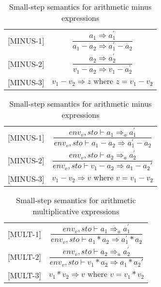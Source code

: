 \begin{table}[H]
    \centering
    \begin{longtable}[c] { r c }
        
        [MINUS-1] & \( \dfrac{a_1 \Rightarrow a^{'}_{1}}{a_1 - a_2 \Rightarrow a^{'}_{1} - a_2} \) \\
        
        [MINUS-2] & \( \dfrac{a_2 \Rightarrow a^{'}_{2}}{v_1 - a_2 \Rightarrow v_1 - a^{'}_{2}} \) \\
        
        [MINUS-3] & \(v_1 - v_2 \Rightarrow z \text{ where } z = v_1 - v_2\) \\
        
        
    \end{longtable}
    \caption{Small-step semantics for arithmetic minus expressions}
\end{table}


\begin{table}[H]
    \centering
    \begin{longtable}[c] { r c }
        [MINUS-1] & \( \dfrac{ env_v,sto \vdash a_1 \Rightarrow_a a^{'}_{1}}{env_v,sto \vdash a_1 - a_2 \Rightarrow a^{'}_{1} - a_2} \) \\
        
        [MINUS-2] & \( \dfrac{ env_v,sto \vdash a_2 \Rightarrow_a a^{'}_{2}}{env_v,sto \vdash v_1 - a_2 \Rightarrow a_{1} - a_2{'}} \) \\
        
        [MINUS-3] & \(v_1 - v_2 \Rightarrow v \text{ where } v = v_1 - v_2\) \\
    \end{longtable}
    \caption{Small-step semantics for arithmetic minus expressions}
\end{table}

\begin{table}[H]
    \centering
    \begin{longtable}[c] { r c }
        [MULT-1] & \( \dfrac{ env_v,sto \vdash a_1 \Rightarrow_a a^{'}_{1}}{env_v,sto \vdash a_1 * a_2 \Rightarrow a^{'}_{1} * a_2} \) \\
        
        [MULT-2] & \( \dfrac{ env_v,sto \vdash a_2 \Rightarrow_a a^{'}_{2}}{env_v,sto \vdash v_1 * a_2 \Rightarrow a_{1} * a_2{'}} \) \\
        
        [MULT-3] & \(v_1 * v_2 \Rightarrow v \text{ where } v = v_1 * v_2\) \\
    \end{longtable}
    \caption{Small-step semantics for arithmetic multiplicative expressions}
\end{table}



